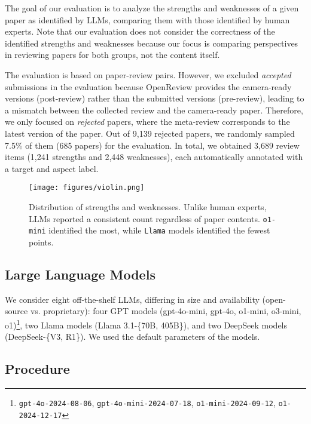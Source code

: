 The goal of our evaluation is to analyze the strengths and weaknesses of a given paper as identified by LLMs, comparing them with those identified by human experts. Note that our evaluation does not consider the correctness of the identified strengths and weaknesses because our focus is comparing perspectives in reviewing papers for both groups, not the content itself.




The evaluation is based on paper-review pairs. However, we excluded \textit{accepted} submissions in the evaluation because OpenReview provides the camera-ready versions (post-review) rather than the submitted versions (pre-review), leading to a mismatch between the collected review and the camera-ready paper. Therefore, we only focused on \textit{rejected} papers, where the meta-review corresponds to the latest version of the paper. Out of 9,139 rejected papers, we randomly sampled 7.5\% of them (685 papers) for the evaluation. In total, we obtained 3,689 review items (1,241 strengths and 2,448 weaknesses), each automatically annotated with a target and aspect label.


\begin{figure}[t]
  \centering
  \texttt{[image: figures/violin.png]}
  \caption{Distribution of strengths and weaknesses. Unlike human experts, LLMs reported a consistent count regardless of paper contents. \texttt{o1-mini} identified the most, while \texttt{Llama} models identified the fewest points.}
  \label{fig:num_reviews}
\end{figure}

\subsection{Large Language Models}
\label{sec:llm}

We consider eight off-the-shelf LLMs, differing in size and availability (open-source vs. proprietary): four GPT models (gpt-4o-mini, gpt-4o, o1-mini, o3-mini, o1)\footnote{\texttt{gpt-4o-2024-08-06}, \texttt{gpt-4o-mini-2024-07-18}, \texttt{o1-mini-2024-09-12}, \texttt{o1-2024-12-17}}, two Llama models (Llama 3.1-\{70B, 405B\}), and two DeepSeek models (DeepSeek-\{V3, R1\}). We used the default parameters of the models.

\subsection{Procedure}

